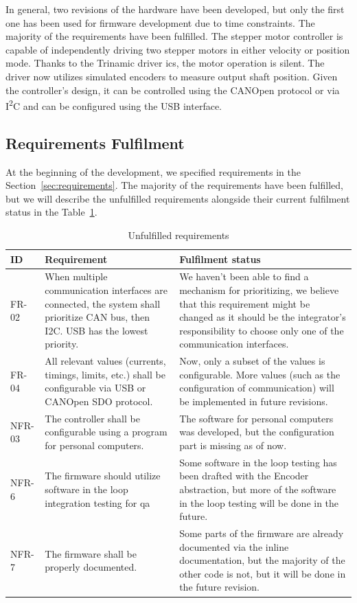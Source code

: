 In general, two revisions of the hardware have been developed, but only the first one has been used for firmware development due to time constraints.
The majority of the requirements have been fulfilled.
The stepper motor controller is capable of independently driving two stepper motors in either velocity or position mode.
Thanks to the Trinamic driver \acs{ic}s, the motor operation is silent.
The driver now utilizes simulated encoders to measure output shaft position.
Given the controller's design, it can be controlled using the CANOpen protocol or via I\textsuperscript{2}C and can be configured using the USB interface.

\subsection{Requirements Fulfilment}
\label{subsec:req_fulfilment}
At the beginning of the development, we specified requirements in the Section~\ref{sec:requirements}.
The majority of the requirements have been fulfilled, but we will describe the unfulfilled requirements alongside their current fulfilment status in the Table~\ref{tab:unfulfilled_req}.

\begin{table}[H]
    \centering
    \begin{tabular}{ |p{2cm}|p{6cm}|p{6cm}| }
        \hline
        ID & Requirement & Fulfilment status \\
        \hline
        \hline
        FR-02 & When multiple communication interfaces are connected, the system shall prioritize CAN bus, then I2C. USB has the lowest priority. & We haven't been able to find a mechanism for prioritizing, we believe that this requirement might be changed as it should be the integrator's responsibility to choose only one of the communication interfaces. \\
        \hline
        FR-04 & All relevant values (currents, timings, limits, etc.) shall be configurable via USB or CANOpen SDO protocol. & Now, only a subset of the values is configurable. More values (such as the configuration of communication) will be implemented in future revisions. \\
        \hline
        NFR-03 & The controller shall be configurable using a program for personal computers. & The software for personal computers was developed, but the configuration part is missing as of now. \\
        \hline
        NFR-6 & The firmware should utilize software in the loop integration testing for \acs{qa} & Some software in the loop testing has been drafted with the Encoder abstraction, but more of the software in the loop testing will be done in the future.\\
        \hline
        NFR-7 & The firmware shall be properly documented. & Some parts of the firmware are already documented via the inline documentation, but the majority of the other code is not, but it will be done in the future revision. \\
        \hline
    \end{tabular}
    \caption{Unfulfilled requirements}
    \label{tab:unfulfilled_req}
\end{table}

